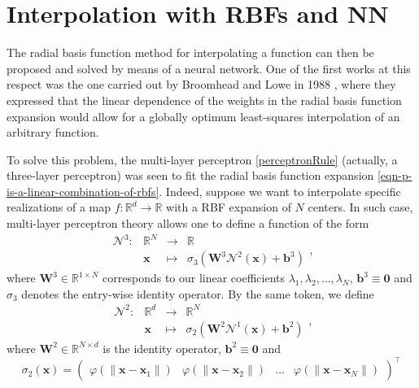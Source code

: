 \documentclass[12pt]{report} %
\newcommand{\tmmathbf}[1]{\ensuremath{\boldsymbol{#1}}}
\begin{document}
\section{Interpolation with RBFs and NN}


The radial basis function method for interpolating a function can then be
proposed and solved by means of a neural network. One of the first works at
this respect was the one carried out by Broomhead and Lowe in 1988
{\cite{broomhead1988multivariable}}, where they expressed that the linear
dependence of the weights in the radial basis function expansion would allow
for a globally optimum least-squares interpolation of an arbitrary function.

To solve this problem, the multi-layer perceptron \eqref{perceptronRule}
(actually, a three-layer perceptron) was seen to fit the radial basis function
expansion \eqref{eqn-p-is-a-linear-combination-of-rbfs}. Indeed, suppose we want
to interpolate specific realizations of a map $f : \mathbb{R}^d \rightarrow
\mathbb{R}$ with a RBF expansion of $N$ centers. In such case, multi-layer
perceptron theory allows one to define a function of the form
\[ \begin{array}{cccc}
     \mathcal{N}^3 : & \mathbb{R}^N & \rightarrow & \mathbb{R}\\
     & \tmmathbf{x} & \mapsto & \sigma_3 (\tmmathbf{W}^3 \mathcal{N}^2
     (\tmmathbf{x}) +\tmmathbf{b}^3)
   \end{array}, \]
where $\tmmathbf{W}^3 \in \mathbb{R}^{1 \times N}$ corresponds to our linear
coefficients $\lambda_1, \lambda_2, \ldots, \lambda_N$, $\tmmathbf{b}^3 \equiv
\tmmathbf{0}$ and $\sigma_3$ denotes the entry-wise identity operator. By the
same token, we define
\[ \begin{array}{cccc}
     \mathcal{N}^2 : & \mathbb{R}^d & \rightarrow & \mathbb{R}^N\\
     & \tmmathbf{x} & \mapsto & \sigma_2 (\tmmathbf{W}^2 \mathcal{N}^1
     (\tmmathbf{x}) +\tmmathbf{b}^2)
   \end{array}, \]
where $\tmmathbf{W}^2 \in \mathbb{R}^{N \times d}$ is the identity operator,
$\tmmathbf{b}^2 \equiv \tmmathbf{0}$ and
\[ \sigma_2 (\tmmathbf{x}) = \left(\begin{array}{cccc}
     \varphi (\| \tmmathbf{x}-\tmmathbf{x}_1 \|) & \varphi (\|
     \tmmathbf{x}-\tmmathbf{x}_2 \|) & \ldots & \varphi (\|
     \tmmathbf{x}-\tmmathbf{x}_N \|)
   \end{array}\right)^{\top} \]
\end{document}
